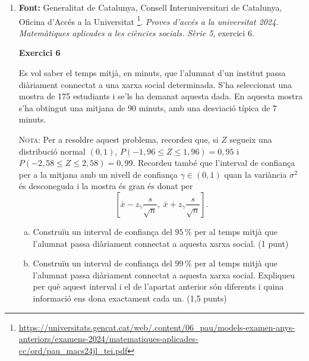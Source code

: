\begin{enumerate}
\begin{enumerate}[3.1.]
 Trobeu un interval de confiança del $95\,\%$ per a la proporció $p$ d'aprovats amb el nou mètode. L'interval obtingut permet afirmar que el nou mètode ha millorat la taxa d'aprovats respecte de la situació anterior? Raoneu la resposta. (1,25 punts)
\end{enumerate}

\item \textbf{Font:} Generalitat de Catalunya, Consell Interuniversitari de Catalunya, Oficina d'Accés a la Universitat \footnote{\url{https://universitats.gencat.cat/web/.content/06_pau/models-examen-anys-anteriors/examens-2024/matematiques-aplicades-cc/ord/pau_macs24jl_tei.pdf}}. \textit{Proves d'accés a la universitat 2024. Matemàtiques aplicades a les ciències socials. Sèrie 5}, exercici 6.

\textbf{Exercici 6}

Es vol saber el temps mitjà, en minuts, que l'alumnat d'un institut passa diàriament connectat a una xarxa social determinada. S'ha seleccionat una mostra de 175 estudiants i se'ls ha demanat aquesta dada. En aquesta mostra s'ha obtingut una mitjana de 90 minuts, amb una desviació típica de 7 minuts.

\textsc{Nota:} Per a resoldre aquest problema, recordeu que, si $Z$ segueix una distribució normal $(0,1)$, $P(-1{,}96 \leq Z \leq 1{,}96) = 0{,}95$ i $P(-2{,}58 \leq Z \leq 2{,}58) = 0{,}99$. Recordeu també que l'interval de confiança per a la mitjana amb un nivell de confiança $\gamma \in (0,1)$ quan la variància $\sigma^2$ és desconeguda i la mostra és gran és donat per $$\left[\bar{x}-z_{\gamma}\frac{s}{\sqrt{n}},\ \bar{x}+z_{\gamma}\frac{s}{\sqrt{n}}\right].$$

\begin{enumerate}[a)]
 \item Construïu un interval de confiança del $95\,\%$ per al temps mitjà que l'alumnat passa diàriament connectat a aquesta xarxa social. (1 punt)
  \item Construïu un interval de confiança del $99\,\%$ per al temps mitjà que l'alumnat passa diàriament connectat a aquesta xarxa social. Expliqueu per què aquest interval i el de l'apartat anterior són diferents i quina informació ens dona exactament cada un. (1,5 punts)
\end{enumerate}


 \end{enumerate}






\newpage

